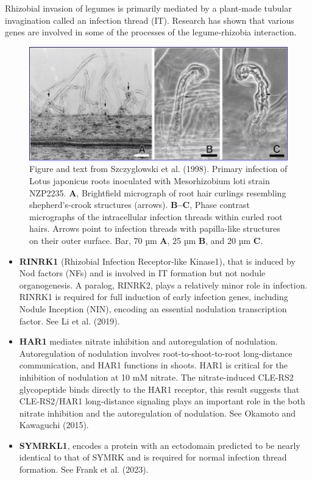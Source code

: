 \documentclass[
  letterpaper,
  DIV=11,
  numbers=noendperiod]{scrartcl}
\providecommand{\tightlist}{%
  \setlength{\itemsep}{0pt}\setlength{\parskip}{0pt}}\usepackage{longtable,booktabs,array}
\begin{document}
Rhizobial invasion of legumes is primarily mediated by a plant-made
tubular invagination called an infection thread (IT). Research has shown
that various genes are involved in some of the processes of the
legume-rhizobia interaction.

\begin{figure}

{\centering \includegraphics[width=8.33333in,height=\textheight]{images/LJinfection.png}

}

\caption{\label{fig-ljinfection}Figure and text from Szczyglowski et al.
(1998). Primary infection of Lotus japonicus roots inoculated with
Mesorhizobium loti strain NZP2235. \textbf{A}, Brightfield micrograph of
root hair curlings resembling shepherd's-crook structures (arrows).
\textbf{B--C}, Phase contrast micrographs of the intracellular infection
threads within curled root hairs. Arrows point to infection threads with
papilla-like structures on their outer surface. Bar, 70 µm \textbf{A},
25 µm \textbf{B}, and 20 µm \textbf{C}.}

\end{figure}

\begin{itemize}
\tightlist
\item
  \textbf{RINRK1} (Rhizobial Infection Receptor-like Kinase1), that is
  induced by Nod factors (NFs) and is involved in IT formation but not
  nodule organogenesis. A paralog, RINRK2, plays a relatively minor role
  in infection. RINRK1 is required for full induction of early infection
  genes, including Nodule Inception (NIN), encoding an essential
  nodulation transcription factor. See Li et al. (2019).
\item
  \textbf{HAR1} mediates nitrate inhibition and autoregulation of
  nodulation. Autoregulation of nodulation involves
  root-to-shoot-to-root long-distance communication, and HAR1 functions
  in shoots. HAR1 is critical for the inhibition of nodulation at 10 mM
  nitrate. The nitrate-induced CLE-RS2 glycopeptide binds directly to
  the HAR1 receptor, this result suggests that CLE-RS2/HAR1
  long-distance signaling plays an important role in the both nitrate
  inhibition and the autoregulation of nodulation. See Okamoto and
  Kawaguchi (2015).
\item
  \textbf{SYMRKL1}, encodes a protein with an ectodomain predicted to be
  nearly identical to that of SYMRK and is required for normal infection
  thread formation. See Frank et al. (2023).
\end{itemize}
\end{document}
